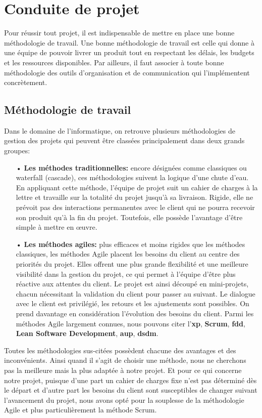 \section{Conduite de projet}
Pour réussir tout projet, il est indispensable de mettre en place une bonne méthodologie de travail. Une bonne méthodologie de travail est celle qui donne à une équipe de pouvoir livrer un produit tout en respectant les délais, les budgets et les ressources disponibles. Par ailleurs, il faut associer à toute bonne méthodologie des outils d'organisation et de communication qui l'implémentent concrètement.
    \subsection{Méthodologie de travail}
    Dans le domaine de l’informatique, on retrouve plusieurs méthodologies de gestion des projets qui peuvent être classées principalement dans deux grands groupes:
        \begin{itemize}
            \item[•] \textbf{Les méthodes traditionnelles: }encore désignées comme classiques ou waterfall (cascade), ces méthodologies suivent la logique d’une chute d’eau. En appliquant cette méthode, l’équipe de projet suit un cahier de charges à la lettre et travaille sur la totalité du projet jusqu’à sa livraison. Rigide, elle ne prévoit pas des interactions permanentes avec le client qui ne pourra recevoir son produit qu’à la fin du projet. Toutefois, elle possède l’avantage d’être simple à mettre en œuvre.
            \item[•] \textbf{Les méthodes agiles: }plus efficaces et moins rigides que les méthodes classiques, les méthodes Agile placent les besoins du client au centre des priorités du projet. Elles offrent une plus grande flexibilité et une meilleure visibilité dans la gestion du projet, ce qui permet à l'équipe d'être plus réactive aux attentes du client. Le projet est ainsi découpé en mini-projets, chacun nécessitant la validation du client pour passer au suivant. Le dialogue avec le client est privilégié, les retours et les ajustements sont possibles. On prend davantage en considération l'évolution des besoins du client. Parmi les méthodes Agile largement connues, nous pouvons citer l'\textbf{\acrfull{xp}},
            \textbf{Scrum}, \textbf{\acrfull{fdd}}, \textbf{Lean Software Development}, \textbf{\acrfull{aup}}, \textbf{\acrfull{dsdm}}.
        \end{itemize}

        Toutes les méthodologies sus-citées possèdent chacune des avantages et des inconvénients. Ainsi quand il s’agit de choisir une méthode, nous ne cherchons pas la meilleure mais la plus adaptée à notre projet. Et pour ce qui concerne notre projet, puisque d’une part un cahier de charges fixe n’est pas déterminé dès le départ et d’autre part les besoins du client sont susceptibles de changer suivant l’avancement du projet, nous avons opté pour la souplesse de la méthodologie Agile et plus particulièrement la méthode Scrum.
        
